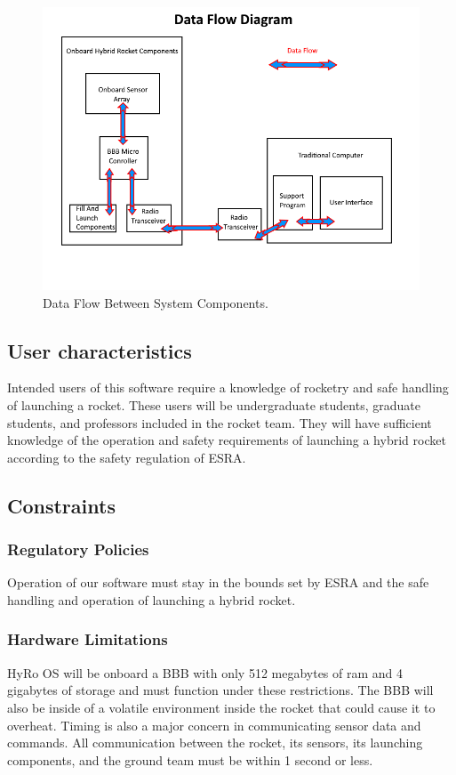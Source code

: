 \documentclass[10pt,draftclsnofoot,onecolumn,compsoc]{IEEEtran}
\begin{document}
\begin{figure}[!ht]
  \caption{Data Flow Between System Components.}
  \centering
	\includegraphics[scale=.85]{RocketBlockDiagram}
\end{figure}
\FloatBarrier
\subsection{ User characteristics}
Intended users of this software require a knowledge of rocketry and safe handling of launching a rocket. These users will be undergraduate students, graduate students, and professors included in the rocket team. They will have sufficient knowledge of the operation and safety requirements of launching a hybrid rocket according to the safety regulation of ESRA.

\subsection{Constraints}

\subsubsection{\bf  Regulatory Policies}Operation of our software must stay in the bounds set by ESRA and the safe handling and operation of launching a hybrid rocket.  

\subsubsection{\bf Hardware Limitations} HyRo OS will be onboard a BBB with only 512 megabytes of ram and 4 gigabytes of storage and must function under these restrictions. The BBB will also be inside of a volatile environment inside the rocket that could cause it to overheat. Timing is also a major concern in communicating sensor data and commands. All communication between the rocket, its sensors, its launching components, and the ground team must be within 1  second or less.
\end{document}
